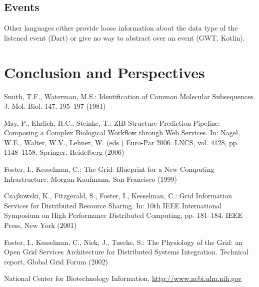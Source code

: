 \documentclass[runningheads,a4paper]{llncs}
\begin{document}
\subsection{Events}

Other languages either provide loose information about the data type of the listened event (Dart) or give no way to
abstract over an event (GWT, Kotlin).

\section{Conclusion and Perspectives}

\begin{thebibliography}{4}

 Smith, T.F., Waterman, M.S.: Identification of Common Molecular
Subsequences. J. Mol. Biol. 147, 195--197 (1981)

 May, P., Ehrlich, H.C., Steinke, T.: ZIB Structure Prediction Pipeline:
Composing a Complex Biological Workflow through Web Services. In: Nagel,
W.E., Walter, W.V., Lehner, W. (eds.) Euro-Par 2006. LNCS, vol. 4128,
pp. 1148--1158. Springer, Heidelberg (2006)

 Foster, I., Kesselman, C.: The Grid: Blueprint for a New Computing
Infrastructure. Morgan Kaufmann, San Francisco (1999)

 Czajkowski, K., Fitzgerald, S., Foster, I., Kesselman, C.: Grid
Information Services for Distributed Resource Sharing. In: 10th IEEE
International Symposium on High Performance Distributed Computing, pp.
181--184. IEEE Press, New York (2001)

 Foster, I., Kesselman, C., Nick, J., Tuecke, S.: The Physiology of the
Grid: an Open Grid Services Architecture for Distributed Systems
Integration. Technical report, Global Grid Forum (2002)

 National Center for Biotechnology Information, \url{http://www.ncbi.nlm.nih.gov}

\end{thebibliography}
\end{document}
